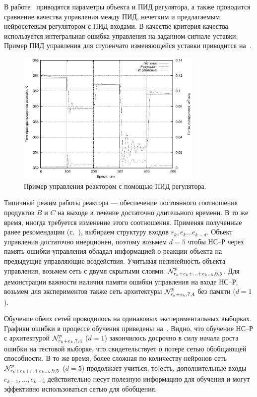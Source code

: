 В работе~\cite{vas-bak2009} приводятся параметры объекта и ПИД
регулятора, а также проводится сравнение качества управления между
ПИД, нечетким и предлагаемым нейросетевым регулятором с ПИД входами.
В качестве критерия качества используется интегральная ошибка
управления на заданном сигнале уставки.  Пример ПИД управления для
ступенчато изменяющейся уставки приводится
на~.

\begin{figure}
\centering
\includegraphics[width=0.8\textwidth,%
  totalheight=0.35\textheight]{cstr_pid_ru}
\caption{Пример управления реактором с помощью ПИД регулятора.}%
\label{fig:cstr_pid_ru}
\end{figure}

Типичный режим работы реактора --- обеспечение постоянного соотношения
продуктов $B$ и $C$ на выходе в течение достаточно длительного
времени.  В то же время, иногда требуется изменение этого соотношения.
Применяя полученные ранее рекомендации
(с.~\pageref{nnc-inputs-rules}), выбираем структуру входов
$r_k,e_k\ldots e_{k-d}$.  Объект управления достаточно инерционен,
поэтому возьмем $d=5$ чтобы НС--Р через память ошибки управления
обладал информацией о реакции объекта на предыдущие управляющие
воздействия.  Учитывая нелинейность объекта управления, возьмем сеть с
двумя скрытыми слоями: $\mathcal{N}^p_{r_k+e_k+\ldots+e_{k-5},9,5}$.  Для
демонстрации важности наличия памяти ошибки управления на входе НС--Р,
возьмем для экспериментов также сеть архитектуры $\mathcal{N}^p_{r_k+e_k,7,4}$
без памяти ($d=1$).

Обучение обеих сетей проводилось на одинаковых экспериментальных
выборках.  Графики ошибки в процессе обучения приведены
на~.  Видно, что обучение НС--Р
с архитектурой $\mathcal{N}^p_{r_k+e_k,7,4}$ ($d=1$) закончилось досрочно в
силу начала роста ошибки на тестовой выборке, что свидетельствует о
потере сетью обобщающей способности.  В то же время, более сложная по
количеству нейронов сеть $\mathcal{N}^p_{r_k+e_k+\ldots+e_{k-5},9,5}$ ($d=5$)
продолжает учиться, то есть, дополнительные входы
$e_{k-1},\ldots,e_{k-5}$ действительно несут полезную информацию для
обучения и могут эффективно использоваться сетью для обобщения.

